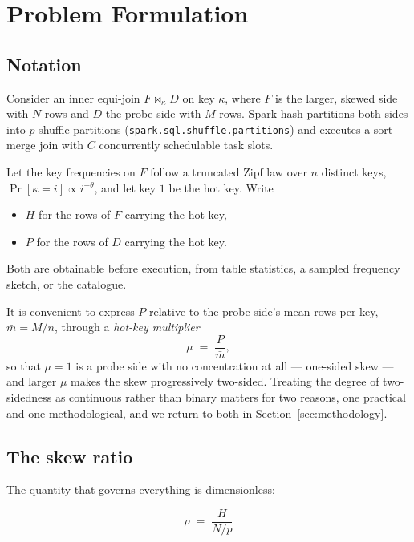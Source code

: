 \section{Problem Formulation}
\label{sec:problem}

\subsection{Notation}

Consider an inner equi-join $F \bowtie_{\kappa} D$ on key $\kappa$, where $F$ is
the larger, skewed side with $N$ rows and $D$ the probe side with $M$ rows.
Spark hash-partitions both sides into $p$ shuffle partitions
(\texttt{spark.sql.shuffle.partitions}) and executes a sort-merge join with $C$
concurrently schedulable task slots.

Let the key frequencies on $F$ follow a truncated Zipf law over $n$ distinct
keys, $\Pr[\kappa = i] \propto i^{-\theta}$, and let key $1$ be the hot key.
Write

\begin{itemize}
\item $H$ for the rows of $F$ carrying the hot key,
\item $P$ for the rows of $D$ carrying the hot key.
\end{itemize}

Both are obtainable before execution, from table statistics, a sampled
frequency sketch, or the catalogue.

It is convenient to express $P$ relative to the probe side's mean rows per key,
$\bar{m} = M/n$, through a \emph{hot-key multiplier}
\begin{equation}
\mu \;=\; \frac{P}{\bar{m}} ,
\label{eq:mu}
\end{equation}
so that $\mu = 1$ is a probe side with no concentration at all --- one-sided
skew --- and larger $\mu$ makes the skew progressively two-sided. Treating the
degree of two-sidedness as continuous rather than binary matters for two
reasons, one practical and one methodological, and we return to both in
Section~\ref{sec:methodology}.

\subsection{The skew ratio}

The quantity that governs everything is dimensionless:

\begin{equation}
\rho \;=\; \frac{H}{N/p}
\label{eq:rho}
\end{equation}

